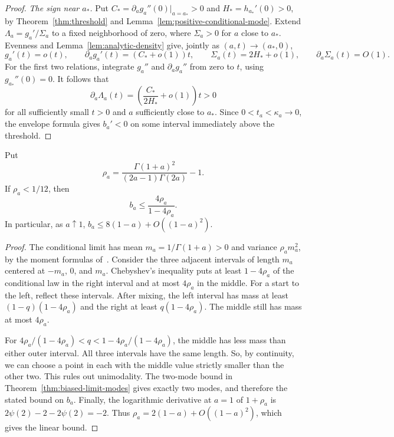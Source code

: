\begin{proof}
\emph{The sign near $a_*$.} Put $C_*=\partial_a g_a''(0)|_{a=a_*}>0$ and
$H_*=h_{a_*}'(0)>0$, by Theorem~\ref{thm:threshold} and
Lemma~\ref{lem:positive-conditional-mode}.
Extend $\Lambda_a=g_a'/\Sigma_a$ to a fixed neighborhood of zero, where
$\Sigma_a>0$ for $a$ close to $a_*$. Evenness and
Lemma~\ref{lem:analytic-density} give, jointly as $(a,t)\to(a_*,0)$,
\[
 g_a'(t)=o(t),\qquad \partial_a g_a'(t)=(C_*+o(1))t,\qquad
 \Sigma_a(t)=2H_*+o(1),\qquad \partial_a\Sigma_a(t)=O(1).
\]
For the first two relations, integrate $g_a''$ and $\partial_a g_a''$
from zero to $t$, using $g_{a_*}''(0)=0$.
It follows that
\[
 \partial_a\Lambda_a(t)=\left(\frac{C_*}{2H_*}+o(1)\right)t>0
\]
for all sufficiently small $t>0$ and $a$ sufficiently close to $a_*$.
Since $0<t_a<\kappa_a\to0$, the envelope formula gives $b_a'<0$
on some interval immediately above the threshold.
\end{proof}

\begin{corollary}\label{cor:bias-boundary-rate}
Put
\[
 \rho_a=\frac{\Gamma(1+a)^2}{(2a-1)\Gamma(2a)}-1.
\]
If $\rho_a<1/12$, then
\[
 b_a\le\frac{4\rho_a}{1-4\rho_a}.
\]
In particular, as $a\uparrow1$,
$b_a\le8(1-a)+O((1-a)^2)$.
\end{corollary}

\begin{proof}
The conditional limit has mean $m_a=1/\Gamma(1+a)>0$ and variance
$\rho_am_a^2$, by the moment formulas of~\cite[Theorem~1.4]{glr2026}.
Consider the three adjacent intervals of length $m_a$ centered at
$-m_a$, $0$, and $m_a$. Chebyshev's inequality puts at least
$1-4\rho_a$ of the conditional law in the right interval and at most
$4\rho_a$ in the middle. For a start to the left, reflect these
intervals. After mixing, the left interval has mass at least
$(1-q)(1-4\rho_a)$ and the right at least $q(1-4\rho_a)$.
The middle still has mass at most $4\rho_a$.

For $4\rho_a/(1-4\rho_a)<q<1-4\rho_a/(1-4\rho_a)$, the middle
has less mass than either outer interval. All three intervals have
the same length. So, by continuity, we can choose a point in each
with the middle value strictly smaller than the other two.
This rules out unimodality. The two-mode bound in
Theorem~\ref{thm:biased-limit-modes} gives exactly two modes, and
therefore the stated bound on $b_a$. Finally, the logarithmic derivative at $a=1$
of $1+\rho_a$ is $2\psi(2)-2-2\psi(2)=-2$.
Thus $\rho_a=2(1-a)+O((1-a)^2)$, which gives the linear bound.
\end{proof}


